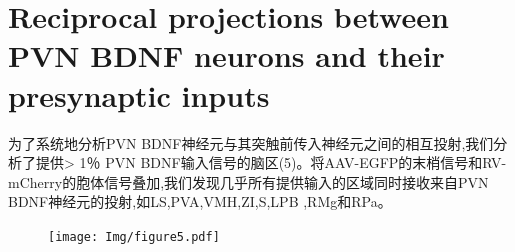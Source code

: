 \section{Reciprocal projections between PVN BDNF neurons and their presynaptic inputs}
为了系统地分析PVN BDNF神经元与其突触前传入神经元之间的相互投射,我们分析了提供> 1％ PVN BDNF输入信号的脑区(\figurename{5})。将AAV-EGFP的末梢信号和RV-mCherry的胞体信号叠加,我们发现几乎所有提供输入的区域同时接收来自PVN BDNF神经元的投射,如LS,PVA,VMH,ZI,S,LPB ,RMg和RPa。


\begin{figure}[!htbp]
    \centering
    \texttt{[image: Img/figure5.pdf]}
    \label{fig:figure5}
\end{figure}